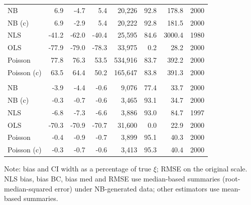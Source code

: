 \begin{table}[ht!]
\begin{tabular*}{\linewidth}{@{\extracolsep{\fill}}lrrrrrrr}
\midrule\addlinespace[2.5pt]
\multicolumn{8}{l}{Po($n$)-NB($m$)} \\[2.5pt] 
\midrule\addlinespace[2.5pt]
NB & 6.9 & -4.7 & 5.4 & 20,226 & 92.8 & 178.8 & 2000 \\ 
NB (c) & 6.9 & -2.9 & 5.4 & 20,222 & 92.8 & 181.5 & 2000 \\ 
NLS & -41.2 & -62.0 & -40.4 & 25,595 & 84.6 & 3000.4 & 1980 \\ 
OLS & -77.9 & -79.0 & -78.3 & 33,975 & 0.2 & 28.2 & 2000 \\ 
Poisson & 77.8 & 76.3 & 53.5 & 534,916 & 83.7 & 392.2 & 2000 \\ 
Poisson (c) & 63.5 & 64.4 & 50.2 & 165,647 & 83.8 & 391.3 & 2000 \\ 
\midrule\addlinespace[2.5pt]
\multicolumn{8}{l}{Po($n$)-Po($m$)} \\[2.5pt] 
\midrule\addlinespace[2.5pt]
NB & -3.9 & -4.4 & -0.6 & 9,076 & 77.4 & 33.7 & 2000 \\ 
NB (c) & -0.3 & -0.7 & -0.6 & 3,465 & 93.1 & 34.7 & 2000 \\ 
NLS & -6.8 & -7.3 & -6.6 & 3,886 & 93.0 & 84.7 & 1997 \\ 
OLS & -70.3 & -70.9 & -70.7 & 31,600 & 0.0 & 22.9 & 2000 \\ 
Poisson & -0.4 & -0.9 & -0.7 & 3,899 & 95.1 & 40.3 & 2000 \\ 
Poisson (c) & -0.3 & -0.7 & -0.6 & 3,413 & 95.3 & 40.4 & 2000 \\ 
\bottomrule
\end{tabular*}
\begin{minipage}{\linewidth}
\vspace{.05em}
Note: bias and CI width as a percentage of true $\xi$; RMSE on the original scale. NLS bias, bias BC, bias med and RMSE use median-based summaries (root-median-squared error) under NB-generated data; other estimators use mean-based summaries.\\
\end{minipage}
\end{table}



